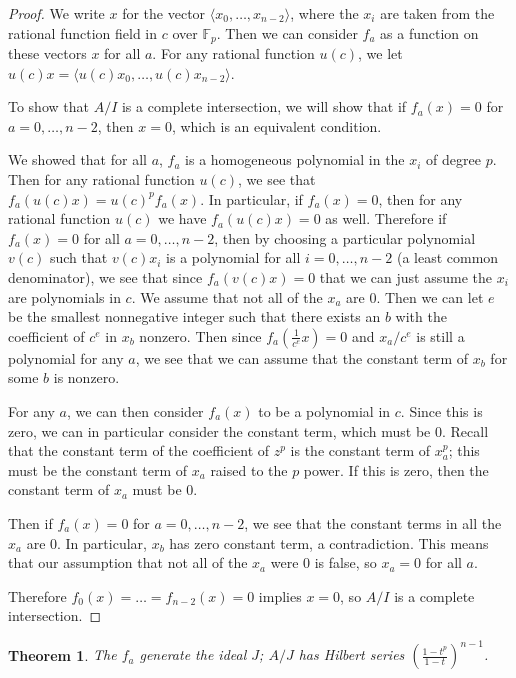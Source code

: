 \documentclass{article}
\numberwithin{equation}{section}
\newtheorem{theorem}[equation]{Theorem}
\begin{document}
\begin{proof} 

We write $x$ for the vector $\langle x_0,\dots, x_{n-2} \rangle$, where the $x_i$ are taken from the rational function field in $c$ over $\mathbb{F}_p$. Then we can consider $f_a$ as a function on these vectors $x$ for all $a$. For any rational function $u( c)$, we let $u(c )x=\langle u(c )x_0,\dots, u(c )x_{n-2}\rangle$. 

To show that $A/I$ is a complete intersection, we will show that if $f_a(x)=0$ for $a=0,\dots,n-2$, then $x=0$, which is an equivalent condition. 

We showed that for all $a$, $f_a$ is a homogeneous polynomial in the $x_i$ of degree $p$. Then for any rational function $u(c )$, we see that $f_a(u(c )x)=u(c )^pf_a(x)$. In particular, if $f_a(x)=0$, then for any rational function $u(c )$ we have $f_a(u(c )x)=0$ as well. Therefore if $f_a(x) = 0$ for all $a=0,\dots,n-2$, then by choosing a particular polynomial $v(c )$ such that $v(c )x_i$ is a polynomial for all $i=0,\dots,n-2$ (a least common denominator), we see that since $f_a(v(c )x)=0$ that we can just assume the $x_i$ are polynomials in $c$. We assume that not all of the $x_a$ are $0$. Then we can let $e$ be the smallest nonnegative integer such that there exists an $b$ with the coefficient of $c^e$ in $x_b$ nonzero. Then since $f_a(\frac{1}{c^e}x)=0$ and $x_a/c^e$ is still a polynomial for any $a$, we see that we can assume that the constant term of $x_b$ for some $b$ is nonzero. 

For any $a$, we can then consider $f_a(x)$ to be a polynomial in $c$. Since this is zero, we can in particular consider the constant term, which must be $0$. Recall that the constant term of the coefficient of $z^p$ is the constant term of $x_a^p$; this must be the constant term of $x_a$ raised to the $p$ power. If this is zero, then the constant term of $x_a$ must be $0$. 

Then if $f_a(x) =0$ for $a=0,\dots,n-2$, we see that the constant terms in all the $x_a$ are $0$. In particular, $x_b$ has zero constant term, a contradiction. This means that our assumption that not all of the $x_a$ were $0$ is false, so $x_a=0$ for all $a$. 

Therefore $f_0(x) = \dots = f_{n-2}(x)=0$ implies $x=0$, so $A/I$ is a complete intersection.
\end{proof}

\begin{theorem} The $f_a$ generate the ideal $J$; $A/J$ has Hilbert series $\left(\frac{1-t^p}{1-t}\right)^{n-1}$. 
\end{theorem}
\end{document}
